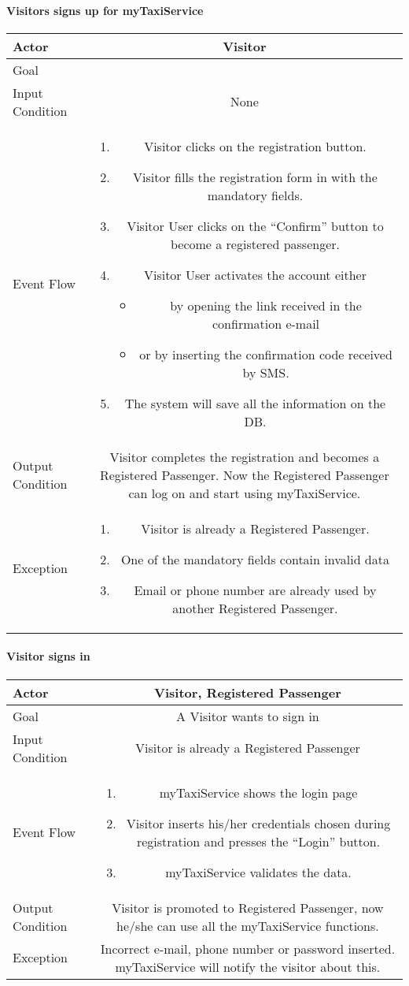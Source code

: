 \documentclass[a4paper,12pt]{article}%
\newcommand{\usecasetable}[6]{
\begin{center}
\begin{tabularx}{\textwidth}{|s|C|}
\hline
Actor & #1\\
\hline
Goal & #2\\
\hline
Input Condition & #3 \\
\hline
Event Flow & #4\\
\hline
Output Condition & #5\\
\hline
Exception & #6\\
\hline
\end{tabularx}
\end{center}
}
\begin{document}
\paragraph{Visitors signs up for myTaxiService}
\usecasetable {Visitor} {} {None} {
\begin{enumerate}
\item Visitor clicks on the registration button.
\item Visitor fills the registration form in with the mandatory fields.
\item Visitor User clicks on the ``Confirm'' button to become a registered passenger. 
\item Visitor User activates the account either
\begin{itemize}
\item by opening the link received in the confirmation e-mail
\item or by inserting the confirmation code received by SMS.
\end{itemize}
\item The system will save all the information on the DB.
\end{enumerate}} 
{
Visitor completes the registration and becomes a Registered Passenger.
Now the Registered Passenger can log on and start using myTaxiService.
} 
{
\begin{enumerate}
\item Visitor is already a Registered Passenger.
\item One of the mandatory fields contain invalid data
\item Email or phone number are already used by another Registered Passenger.
\end{enumerate}}
\paragraph{Visitor signs in}
\usecasetable {Visitor, Registered Passenger}{A Visitor wants to sign in} {Visitor is already a Registered Passenger} {
\begin{enumerate}
\item myTaxiService shows the login page
\item Visitor inserts his/her credentials chosen during registration and presses the ``Login'' button.
\item myTaxiService validates the data. 
\end{enumerate}}{Visitor is promoted to Registered Passenger, now he/she can use all the myTaxiService functions.}{Incorrect e-mail, phone number or password inserted. myTaxiService will notify the visitor about this.}
\end{document}
